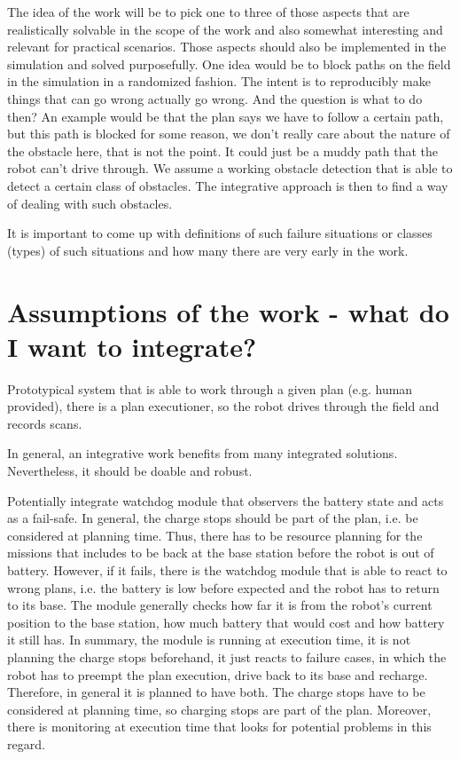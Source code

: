 \documentclass[german, master, expose, latin1]{base/thesis_KBS}
\begin{document}
The idea of the work will be to pick one to three of those aspects that are realistically solvable in the scope of the work and also somewhat interesting and 
relevant for practical scenarios. Those aspects should also be implemented in the simulation and solved purposefully.\newline
One idea would be to block paths on the field in the simulation in a randomized fashion. The intent is to reproducibly make things that can go wrong actually go wrong.
And the question is what to do then? An example would be that the plan says we have to follow a certain path, but this path is blocked for some reason, we don't really
care about the nature of the obstacle here, that is not the point. It could just be a muddy path that the robot can't drive through. We assume a working obstacle detection
that is able to detect a certain class of obstacles. The integrative approach is then to find a way of dealing with such obstacles.\newline

It is important to come up with definitions of such failure situations or classes (types) of such situations and how many there are very early in the work.

\section{Assumptions of the work - what do I want to integrate?}

Prototypical system that is able to work through a given plan (e.g. human provided), there is a plan executioner, so the robot drives through the field and records scans.\newline

In general, an integrative work benefits from many integrated solutions. Nevertheless, it should be doable and robust.\newline

Potentially integrate watchdog module that observers the battery state and acts as a fail-safe. In general, the charge stops should be part of the plan,
i.e. be considered at planning time. Thus, there has to be resource planning for the missions that includes to be back at the base station before the robot is out of battery.
However, if it fails, there is the watchdog module that is able to react to wrong plans, i.e. the battery is low before expected and the robot has to return to its base.
The module generally checks how far it is from the robot's current position to the base station, how much battery that would cost and how battery it still has.
In summary, the module is running at execution time, it is not planning the charge stops beforehand, it just reacts to failure cases, in which the robot has to preempt
the plan execution, drive back to its base and recharge. Therefore, in general it is planned to have both. The charge stops have to be considered at planning time,
so charging stops are part of the plan. Moreover, there is monitoring at execution time that looks for potential problems in this regard.\newline
\end{document}
